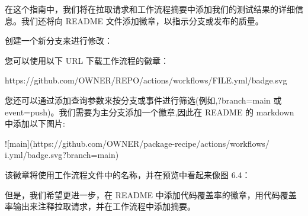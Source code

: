 
在这个指南中，我们将在拉取请求和工作流程摘要中添加我们的测试结果的详细信息。我们还将向 README 文件添加徽章，以指示分支或发布的质量。


创建一个新分支来进行修改：



您可以使用以下 URL 下载工作流程的徽章：

\begin{shell}
https://github.com/OWNER/REPO/actions/workflows/FILE.yml/badge.svg
\end{shell}

您还可以通过添加查询参数来按分支或事件进行筛选(例如,?branch=main 或 event=push)。我们需要为主分支添加一个徽章,因此在 README 的 markdown 中添加以下图片:

\begin{shell}
![main](https://github.com/OWNER/package-recipe/actions/workflows/ i.yml/badge.svg?branch=main)
\end{shell}

该徽章将使用工作流程文件中的名称，并在预览中看起来像图 6.4：


但是，我们希望更进一步，在 README 中添加代码覆盖率的徽章，用代码覆盖率输出来注释拉取请求，并在工作流程中添加摘要。

